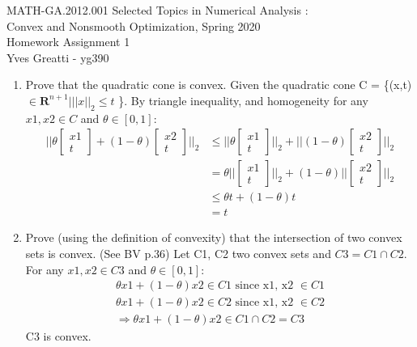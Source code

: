 \documentclass[10pt]{article}
\newcommand{\0}{\mat{0}}
\begin{document}
\noindent MATH-GA.2012.001 Selected Topics in Numerical Analysis :\\
Convex and Nonsmooth Optimization, Spring 2020\\
Homework Assignment 1 \\
Yves Greatti - yg390\\

\begin{enumerate}
\item Prove that the quadratic cone is convex.
Given the quadratic cone C = \{(x,t) $\in \mathbf{R}^{n+1} | ||x||_2 \le t$ \}. By triangle inequality, and homogeneity for any $x1,x2 \in C$ and $\theta \in [0,1]$:
\begin{align*}
|| \theta 
		\begin{bmatrix}
    			x1 \\ 
			t
		\end{bmatrix} 
+ (1 - \theta) 
		\begin{bmatrix}
    			x2 \\ 
			t
		\end{bmatrix} ||_2 &\le 
|| \theta 
		\begin{bmatrix}
    			x1 \\ 
			t
		\end{bmatrix} ||_2 +	
|| (1 - \theta) 
		\begin{bmatrix}
    			x2 \\ 
			t
		\end{bmatrix} ||_2 \\
		&= \theta ||
		\begin{bmatrix}
    			x1 \\ 
			t
		\end{bmatrix} ||_2 +	
(1 - \theta) ||
		\begin{bmatrix}
    			x2 \\ 
			t
		\end{bmatrix} ||_2 \\
		& \le \theta t + (1-\theta) t \\
		&= t	
\end{align*}

\item Prove (using the definition of convexity) that the intersection of two convex sets is convex. (See BV p.36) 
Let C1, C2 two convex sets and $C3 = C1 \cap C2$. For any $x1, x2 \in C3$ and $\theta \in [0,1]$:
\begin{align*}
	\theta x1 + (1-\theta) x2 \in C1 \text{ since x1, x2 } \in C1 \\
	\theta x1 + (1-\theta) x2 \in C2 \text{ since x1, x2 } \in C2 \\
	\Rightarrow \theta x1 + (1-\theta) x2 \in C1 \cap C2 = C3
\end{align*}
C3 is convex.


\end{enumerate}
\end{document}

